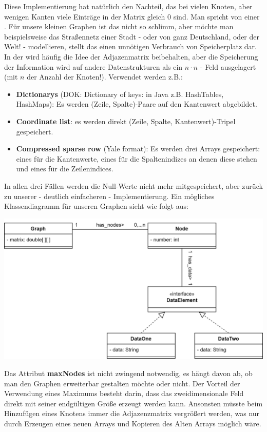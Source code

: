 \documentclass{article}
\begin{document}
Diese Implementierung hat natürlich den Nachteil, das bei vielen Knoten, aber wenigen Kanten viele Einträge in der Matrix gleich $0$ sind. Man spricht von einer . Für unsere kleinen Graphen ist das nicht so schlimm, aber möchte man beispielsweise das Straßennetz einer Stadt - oder von ganz Deutschland, oder der Welt! - modellieren, stellt das einen unnötigen Verbrauch von Speicherplatz dar. In der  wird häufig die Idee der Adjazenmatrix beibehalten, aber die Speicherung der Information wird auf andere Datenstrukturen als ein $n\cdot n$ - Feld ausgelagert (mit $n$ der Anzahl der Knoten!). Verwendet werden z.B.:
\begin{itemize}
    \item \textbf{Dictionarys} (DOK: Dictionary of keys: in Java z.B. HashTables, HashMaps): Es werden (Zeile, Spalte)-Paare auf den Kantenwert abgebildet.
    \item \textbf{Coordinate list}: es werden direkt (Zeile, Spalte, Kantenwert)-Tripel gespeichert. 
    \item \textbf{Compressed sparse row} (Yale format): Es werden drei Arrays gespeichert: eines für die Kantenwerte, eines für die Spaltenindizes an denen diese stehen und eines für die Zeilenindices.
\end{itemize}
In allen drei Fällen werden die Null-Werte nicht mehr mitgespeichert, aber zurück zu unserer - deutlich einfacheren - Implementierung. Ein mögliches Klassendiagramm für unseren Graphen sieht wie folgt aus: 
\begin{center}
    \includegraphics[scale=0.2]{../media/graph_advanced.png}
\end{center}
Das Attribut \textbf{maxNodes} ist nicht zwingend notwendig, es hängt davon ab, ob man den Graphen erweiterbar gestalten möchte oder nicht. Der Vorteil der Verwendung eines Maximums besteht darin, dass das zweidimensionale Feld direkt mit seiner endgültigen Größe erzeugt werden kann. Ansonsten müsste beim Hinzufügen eines Knotens immer die Adjazenzmatrix vergrößert werden, was nur durch Erzeugen eines neuen Arrays und Kopieren des Alten Arrays möglich wäre. \\
\end{document}
